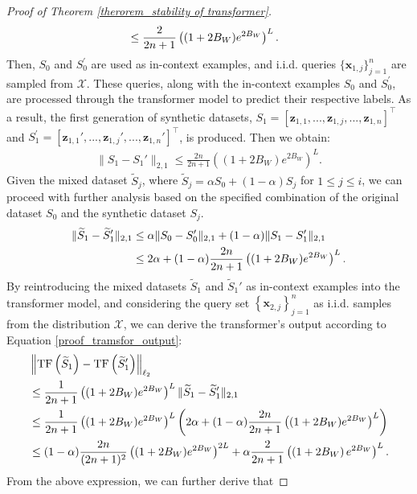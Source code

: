 \begin{proof}[Proof of Theorem \ref{therorem_stability of transformer}]
\begin{align}
    &\leq  \frac{2}{2 n+1}\left((1+2B_W) e^{2B_W}\right)^L \notag .
\end{align}
Then, $S_0$ and $S_0^{\prime}$ are used as in-context examples, and i.i.d. queries $\{\boldsymbol{x}_{1,j}\}_{j=1}^n$ are sampled from $\mathcal{X}$. These queries, along with the in-context examples $S_0$ and $S_0^{\prime}$, are processed through the transformer model to predict their respective labels. As a result, the first generation of synthetic datasets, $S_1=[\boldsymbol{z}_{1,1},...,\boldsymbol{z}_{1,j},...,\boldsymbol{z}_{1,n}]^{\top}$ and $S_1^{\prime}=[\boldsymbol{z}_{1,1}',...,\boldsymbol{z}_{1,j}',...,\boldsymbol{z}_{1,n}']^{\top}$, is produced. Then we obtain:
\begin{align}
    \|S_1-S_1'\|_{2,1}\leq \frac{2n}{2 n+1}\left((1+2B_W) e^{2B_W}\right)^L.
\end{align}
Given the mixed dataset $\widetilde{S}_j$, where $\widetilde{S}_j=\alpha S_0+(1-\alpha) S_j$ for $1 \leq j \leq i$, we can proceed with further analysis based on the specified combination of the original dataset $S_0$ and the synthetic dataset $S_j$.
\begin{align}
    \|\widetilde{S}_1-\widetilde{S}_1'\|_{2,1}&\leq \alpha\|S_0-S_0'\|_{2,1}+(1-\alpha) \|S_1-S_1'\|_{2,1} \notag \\
    &\leq 2\alpha+(1-\alpha)\frac{2n}{2 n+1}\left((1+2B_W) e^{2B_W}\right)^L.
\end{align}
By reintroducing the mixed datasets $\widetilde{S}_1$ and $\widetilde{S}_1'$ as in-context examples into the transformer model, and considering the query set $\left\{\boldsymbol{x}_{2, j}\right\}_{j=1}^n$ as i.i.d. samples from the distribution $\mathcal{X}$, we can derive the transformer's output according to Equation \ref{proof_tramsfor_output}:
\begin{align}
    &\left\|\mathrm{TF}\left(\widetilde{S}_1\right)-\mathrm{TF}\left(\widetilde{S}_1'\right)\right\|_{\ell_2} \notag\\
    &\leq \frac{1}{2 n+1}\left((1+2B_W) e^{2B_W}\right)^L \|\widetilde{S}_1-\widetilde{S}_1'\|_{2,1} \notag \\
    &\leq  \frac{1}{2 n+1}\left((1+2B_W) e^{2B_W}\right)^L \left(2\alpha+(1-\alpha)\frac{2n}{2 n+1}\left((1+2B_W) e^{2B_W}\right)^L\right)\notag \\
    &\leq (1-\alpha)\frac{2n}{(2 n+1)^2}\left((1+2B_W) e^{2B_W}\right)^{2L}+\alpha \frac{2}{2 n+1}\left(\left(1+2 B_W\right) e^{2 B_W}\right)^L.
\end{align}
From the above expression, we can further derive that

\end{proof}
